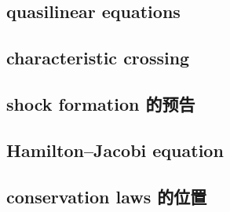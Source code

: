 

\subsection{quasilinear equations}
\label{b2:subsec:070401}

\subsection{characteristic crossing}
\label{b2:subsec:070402}

\subsection{shock formation 的预告}
\label{b2:subsec:070403}

\subsection{Hamilton–Jacobi equation}
\label{b2:subsec:070404}

\subsection{conservation laws 的位置}
\label{b2:subsec:070405}


